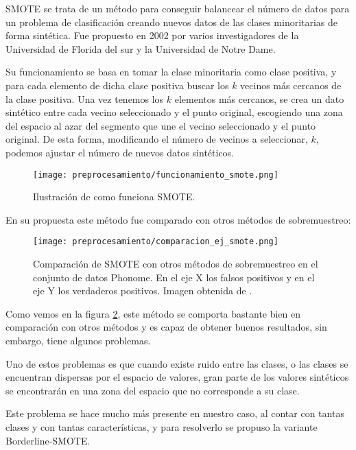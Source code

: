 SMOTE \cite{SMOTE} se trata de un método para conseguir balancear el número de datos para un problema de clasificación creando nuevos datos de las clases minoritarias de forma sintética. Fue propuesto en 2002 por varios investigadores de la Universidad de Florida del sur y la Universidad de Notre Dame.

Su funcionamiento se basa en tomar la clase minoritaria como clase positiva, y para cada elemento de dicha clase positiva buscar los $k$ vecinos más cercanos de la clase positiva. Una vez tenemos los $k$ elementos más cercanos, se crea un dato sintético entre cada vecino seleccionado y el punto original, escogiendo una zona del espacio al azar del segmento que une el vecino seleccionado y el punto original. De esta forma, modificando el número de vecinos a seleccionar, $k$, podemos ajustar el número de nuevos datos sintéticos.

\begin{figure}[H]
	\centering
	\texttt{[image: preprocesamiento/funcionamiento\_smote.png]}
	\caption{Ilustración de como funciona SMOTE.}
	\label{fig:funcionamiento_smote}
\end{figure}

\newpage

En su propuesta este método fue comparado con otros métodos de sobremuestreo:

\begin{figure}[H]
	\centering
	\texttt{[image: preprocesamiento/comparacion\_ej\_smote.png]}
	\caption{Comparación de SMOTE con otros métodos de sobremuestreo en el conjunto de datos Phonome. En el eje X los falsos positivos y en el eje Y los verdaderos positivos. Imagen obtenida de \cite{SMOTE}.}
	\label{fig:comparacionSMOTE}
\end{figure}

Como vemos en la figura \ref{fig:comparacionSMOTE}, este método se comporta bastante bien en comparación con otros métodos y es capaz de obtener buenos resultados, sin embargo, tiene algunos problemas.

Uno de estos problemas es que cuando existe ruido entre las clases, o las clases se encuentran dispersas por el espacio de valores, gran parte de los valores sintéticos se encontrarán en una zona del espacio que no corresponde a su clase.

Este problema se hace mucho más presente en nuestro caso, al contar con tantas clases y con tantas características, y para resolverlo se propuso la variante Borderline-SMOTE.

